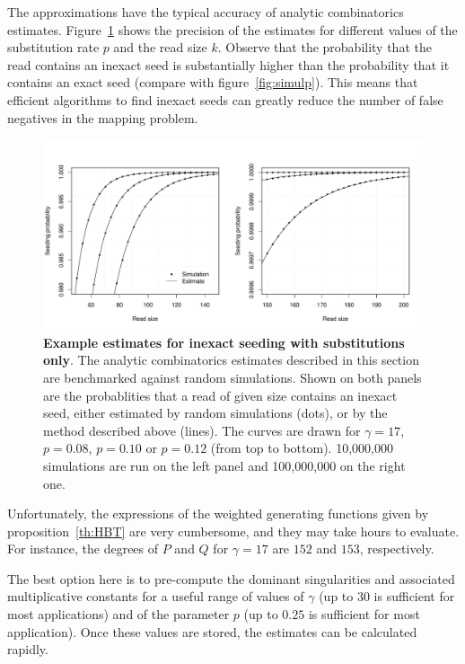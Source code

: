 \documentclass{article}
\begin{document}
The approximations have the typical accuracy of analytic combinatorics
estimates. Figure~\ref{fig:simulpinexact} shows the precision of the
estimates for different values of the substitution rate $p$ and the read
size $k$. Observe that the probability that the read contains an inexact
seed is substantially higher than the probability that it contains an
exact seed (compare with figure~\ref{fig:simulp}). This means that
efficient algorithms to find inexact seeds can greatly reduce the number
of false negatives in the mapping problem.


\begin{figure}[h]
\centering
\includegraphics[scale=0.445]{simulp-inexact.pdf}
\caption{\textbf{Example estimates for inexact seeding with substitutions
only}. The analytic combinatorics estimates described in this section
are benchmarked against random simulations.  Shown on both panels are the
probablities that a read of given size contains an inexact seed, either
estimated by random simulations (dots), or by the method described above
(lines). The curves are drawn for $\gamma=17$, $p=0.08$, $p=0.10$ or
$p=0.12$ (from top to bottom). 10,000,000 simulations are run on the left
panel and 100,000,000 on the right one.}
\label{fig:simulpinexact}
\end{figure}


Unfortunately, the expressions of the weighted generating functions given
by proposition~\ref{th:HBT} are very cumbersome, and they may take hours
to evaluate. For instance, the degrees of $P$ and $Q$ for $\gamma=17$ are
$152$ and $153$, respectively.

The best option here is to pre-compute the dominant singularities and
associated multiplicative constants for a useful range of values of
$\gamma$ (up to $30$ is sufficient for most applications) and of the
parameter $p$ (up to $0.25$ is sufficient for most application). Once
these values are stored, the estimates can be calculated rapidly.
\end{document}
